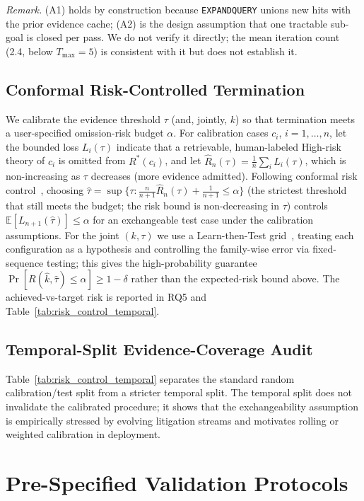 \noindent\textit{Remark.} (A1) holds by construction because \texttt{EXPANDQUERY} unions new hits with the prior evidence cache; (A2) is the design assumption that one tractable sub-goal is closed per pass. We do not verify it directly; the mean iteration count (2.4, below $T_{\max}{=}5$) is consistent with it but does not establish it.

\subsection{Conformal Risk-Controlled Termination}
We calibrate the evidence threshold $\tau$ (and, jointly, $k$) so that termination meets a user-specified omission-risk budget $\alpha$.
For calibration cases $c_i$, $i=1,\dots,n$, let the bounded loss $L_i(\tau)$ indicate that a retrievable, human-labeled High-risk theory of $c_i$ is omitted from $R^*(c_i)$, and let $\hat R_n(\tau)=\frac1n\sum_i L_i(\tau)$, which is non-increasing as $\tau$ decreases (more evidence admitted).
Following conformal risk control~\citep{angelopoulos2023conformalrisk}, choosing
$\hat\tau=\sup\{\tau:\tfrac{n}{n+1}\hat R_n(\tau)+\tfrac{1}{n+1}\le\alpha\}$ (the strictest threshold that still meets the budget; the risk bound is non-decreasing in $\tau$)
controls $\mathbb{E}[L_{n+1}(\hat\tau)]\le\alpha$ for an exchangeable test case under the calibration assumptions.
For the joint $(k,\tau)$ we use a Learn-then-Test grid~\citep{angelopoulos2021ltt}, treating each configuration as a hypothesis and controlling the family-wise error via fixed-sequence testing; this gives the high-probability guarantee $\Pr[R(\hat k,\hat\tau)\le\alpha]\ge 1-\delta$ rather than the expected-risk bound above.
The achieved-vs-target risk is reported in RQ5 and Table~\ref{tab:risk_control_temporal}.

\subsection{Temporal-Split Evidence-Coverage Audit}
\label{app:risk_control}
Table~\ref{tab:risk_control_temporal} separates the standard random calibration/test split from a stricter temporal split. The temporal split does not invalidate the calibrated procedure; it shows that the exchangeability assumption is empirically stressed by evolving litigation streams and motivates rolling or weighted calibration in deployment.



\section{Pre-Specified Validation Protocols}
\label{app:protocols}


